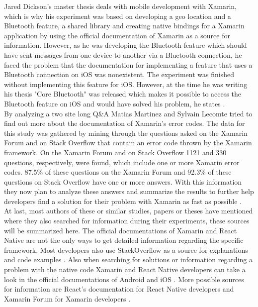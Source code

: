 \documentclass[Bachelor,BIF,english]{twbook}
\begin{document}
Jared Dickson's master thesis deals with mobile development with Xamarin, which is why his experiment was based on developing a geo location and a Bluetooth feature, a shared library and creating native bindings for a Xamarin application by using the official documentation of Xamarin \cite{XamarinDoc} as a source for information. However, as he was developing the Bluetooth feature which should have sent messages from one device to another via a Bluetooth connection, he faced the problem that the documentation for implementing a feature that uses a Bluetooth connection on iOS was nonexistent. The experiment was finished without implementing this feature for iOS. However, at the time he was writing his thesis "Core Bluetooth" was released which makes it possible to access the Bluetooth feature on iOS and would have solved his problem, he states \cite[p.~11]{Dickson_2013}.
\\[\baselineskip]
By analyzing a two site long Q\&A Matias Martinez and Sylvain Lecomte tried to find out more about the documentation of Xamarin's error codes. The data for this study was gathered by mining through the questions asked on the Xamarin Forum and on Stack Overflow that contain an error code thrown by the Xamarin framework. On the Xamarin Forum and on Stack Overflow 1121 and 330 questions, respectively, were found, which include one or more Xamarin error codes. 87.5\% of these questions on the Xamarin Forum and 92.3\% of these questions on Stack Overflow have one or more answers. With this information they now plan to analyze these answers and summarize the results to further help developers find a solution for their problem with Xamarin as fast as possible \cite[p.~1,~4]{MartinezLecomte2018}.
\\[\baselineskip]
At last, most authors of these or similar studies, papers or theses have mentioned where they also searched for information during their experiments, these sources will be summarized here. The official documentations of Xamarin and React Native are not the only ways to get detailed information regarding the specific framework. Most developers also use StackOverflow as a source for explanations and code examples \cite{MartinezLecomte2018}. Also when searching for solutions or information regarding a problem with the native code Xamarin and React Native developers can take a look in the official documentations of Android and iOS \cite[p.~11]{Dickson_2013}. More possible sources for information are React's documentation for React Native developers \cite{ReactDoc} and Xamarin Forum for Xamarin developers \cite[p.~51]{Danielsson_2016} \cite{MartinezLecomte2018}.
\end{document}

